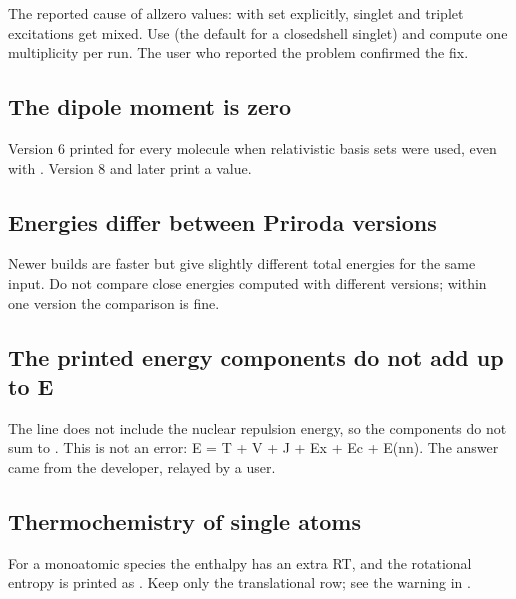 \documentclass[letterpaper,10pt,english,openany,oneside]{sphinxmanual}
\begin{document}
\sphinxAtStartPar
The reported cause of all\sphinxhyphen{}zero values: with  set explicitly, singlet and triplet excitations get mixed.
Use {\hyperref[\detokenize{reference/scf:scf-restrict}]{}} (the default for a closed\sphinxhyphen{}shell singlet) and compute one multiplicity per
run.
The user who reported the problem confirmed the fix.




\subsection{The dipole moment is zero}
\label{\detokenize{troubleshooting/common-problems:the-dipole-moment-is-zero}}
\sphinxAtStartPar
Version 6 printed  for every molecule when relativistic basis sets were used,
even with . Version 8 and later print a value.




\subsection{Energies differ between Priroda versions}
\label{\detokenize{troubleshooting/common-problems:energies-differ-between-priroda-versions}}
\sphinxAtStartPar
Newer builds are faster but give slightly different total energies for the same input. Do not compare close
energies computed with different versions; within one version the comparison is fine.




\subsection{The printed energy components do not add up to E}
\label{\detokenize{troubleshooting/common-problems:the-printed-energy-components-do-not-add-up-to-e}}
\sphinxAtStartPar
The line  does not include the nuclear repulsion energy, so the
components do not sum to . This is not an error: E = T + V + J + Ex + Ec + E(nn). The answer came from the developer,
relayed by a user.




\subsection{Thermochemistry of single atoms}
\label{\detokenize{troubleshooting/common-problems:thermochemistry-of-single-atoms}}
\sphinxAtStartPar
For a monoatomic species the enthalpy has an extra RT, and the rotational entropy is printed as . Keep only
the translational row; see the warning in {\hyperref[\detokenize{start/getting-started:qs-thermo}]{}}.
\end{document}
